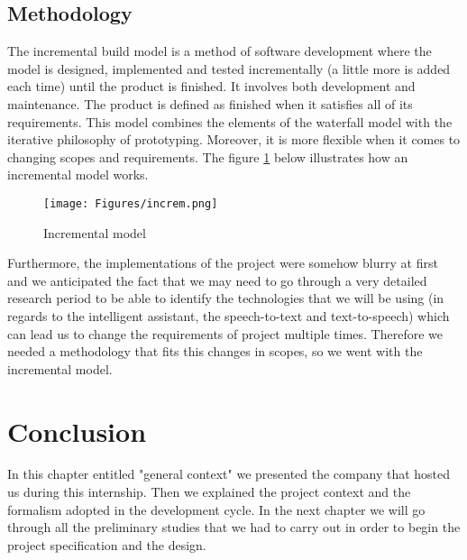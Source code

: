 \subsection{Methodology}
The incremental build model is a method of software development where the model is designed, implemented and tested incrementally (a little more is added each time) until the product is finished. It involves both development and maintenance. The product is defined as finished when it satisfies all of its requirements. This model combines the elements of the waterfall model with the iterative philosophy of prototyping. Moreover, it is more flexible when it comes to changing scopes and requirements. The figure \ref{fig:model} below illustrates how an incremental model works.
\begin{figure}[H]
\centering
\texttt{[image: Figures/increm.png]}
\caption{Incremental model}
\label{fig:model}
\end{figure}

Furthermore, the implementations of the project were somehow blurry at first and we anticipated the fact that we may need to go through a very detailed research period to be able to identify the technologies that we will be using (in regards to the intelligent assistant, the speech-to-text and text-to-speech) which can lead us to change the requirements of project multiple times. Therefore we needed a methodology that fits this changes in scopes, so we went with the incremental model.     

\section{Conclusion}
In this chapter entitled "general context" we presented the company that hosted us during this internship. Then we explained the project context and the formalism adopted in the development cycle. In the next chapter we will go through all the preliminary studies that we had to carry out in order to begin the project specification and the design.